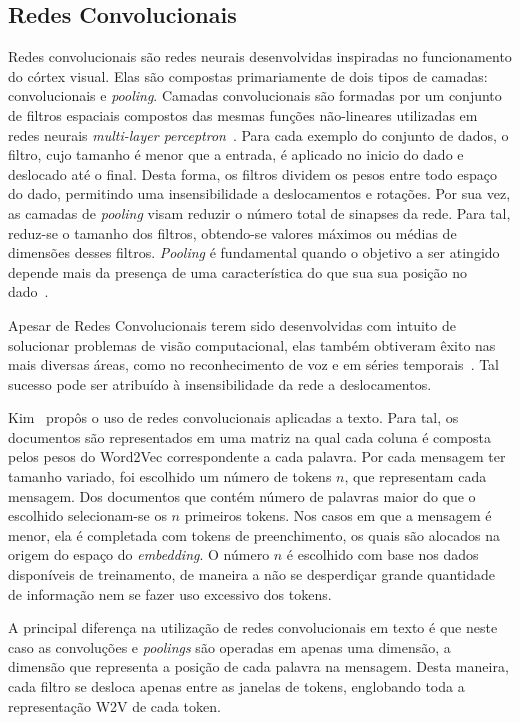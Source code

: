 \subsection{Redes Convolucionais}

Redes convolucionais são redes neurais desenvolvidas inspiradas no funcionamento do córtex visual.
Elas são compostas primariamente de dois tipos de camadas: convolucionais e \textit{pooling}.
Camadas convolucionais são formadas por um conjunto de filtros espaciais compostos das mesmas funções não-lineares
utilizadas em redes neurais \textit{multi-layer perceptron}~\cite{goodfellow16}.
Para cada exemplo do conjunto de dados, o filtro, cujo tamanho é menor que a entrada, é aplicado no inicio do dado e
deslocado até o final.
Desta forma, os filtros dividem os pesos entre todo espaço do dado, permitindo uma insensibilidade a deslocamentos e
rotações.
Por sua vez, as camadas de \textit{pooling} visam reduzir o número total de sinapses da rede.
Para tal, reduz-se o tamanho dos filtros, obtendo-se valores máximos ou médias de dimensões desses filtros.
\textit{Pooling} é fundamental quando o objetivo a ser atingido depende mais da presença de uma característica do que
sua sua posição no dado~\cite{goodfellow16}.

Apesar de Redes Convolucionais terem sido desenvolvidas com intuito de solucionar problemas de visão computacional,
elas também obtiveram êxito nas mais diversas áreas, como no reconhecimento de voz e em séries temporais~\cite{lecun95}.
Tal sucesso pode ser atribuído à insensibilidade da rede a deslocamentos.

Kim~\cite{kim14} propôs o uso de redes convolucionais aplicadas a texto.
Para tal, os documentos são representados em uma matriz na qual cada coluna é composta pelos pesos do Word2Vec
correspondente a cada palavra.
Por cada mensagem ter tamanho variado, foi escolhido um número de tokens $n$, que representam cada mensagem.
Dos documentos que contém número de palavras maior do que o escolhido selecionam-se os $n$ primeiros tokens.
Nos casos em que a mensagem é menor, ela é completada com tokens de preenchimento, os quais são alocados na origem do
espaço do \textit{embedding}.
O número $n$ é escolhido com base nos dados disponíveis de treinamento, de maneira a não se desperdiçar grande
quantidade de informação nem se fazer uso excessivo dos tokens.

A principal diferença na utilização de redes convolucionais em texto é que neste caso as convoluções e \textit{poolings}
são operadas em apenas uma dimensão, a dimensão que representa a posição de cada palavra na mensagem.
Desta maneira, cada filtro se desloca apenas entre as janelas de tokens, englobando toda a representação W2V de cada
token.

